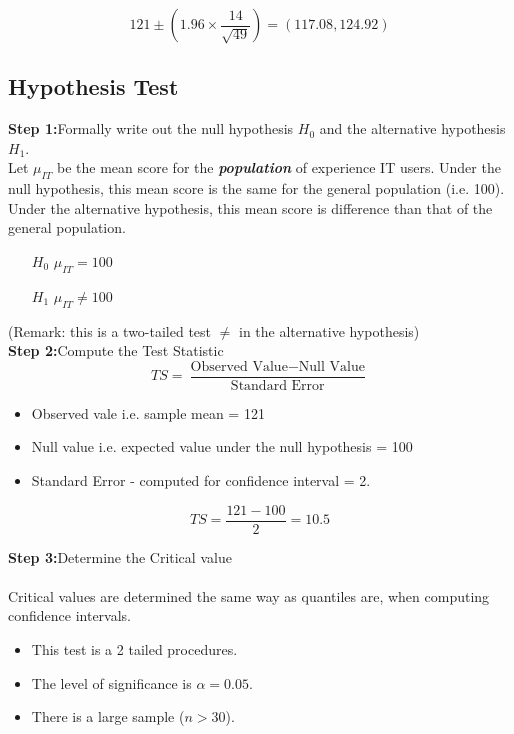 \documentclass[a4paper,12pt]{article}
\begin{document}
\[ 121 \pm \left( 1.96 \times \frac{14}{\sqrt{49}} \right) = (117.08,124.92) \]

\newpage
\subsection{Hypothesis Test}

\textbf{Step 1:}Formally write out the null hypothesis $H_0$ and the alternative hypothesis $H_1$.\\

Let $\mu_{IT}$ be the mean score for the \textbf{\textit{population}} of experience IT users. Under the null hypothesis, this mean score is the same for the general population (i.e. 100). Under the alternative hypothesis, this mean score is difference than that of the general population.

\begin{itemize}
\item[$H_0$] $\mu_{IT} = 100$
\item[$H_1$] $\mu_{IT} \neq 100$
\end{itemize} 

(Remark: this is a two-tailed test $\neq$ in the alternative hypothesis)\\



\noindent\textbf{Step 2:}Compute the Test Statistic\\

\[ TS = \frac{\mbox{Observed Value} - \mbox{Null Value}}{\mbox{Standard Error}} \]

\begin{itemize}
\item Observed vale i.e. sample mean = 121
\item Null value i.e. expected value under the null hypothesis  = 100
\item Standard Error - computed for confidence interval = 2.
\end{itemize} 

\[ TS = \frac{121 - 100}{2} = 10.5 \]


\noindent\textbf{Step 3:}Determine the Critical value\\\\

Critical values are determined the same way as quantiles are, when computing confidence intervals.

\begin{itemize}
\item  This test is a 2 tailed procedures.
\item The level of significance is $\alpha= 0.05$.
\item There is a large sample ($n >30$).
\end{itemize}
\end{document}
